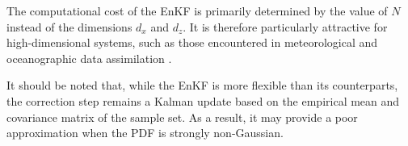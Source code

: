 The computational cost of the EnKF is primarily determined by the value of $N$ instead of the dimensions $d_x$ and $d_z$. It is therefore particularly attractive for high-dimensional systems, such as those encountered in meteorological and oceanographic data assimilation \cite{bib:EnKF-atmosphere}.

It should be noted that, while the EnKF is more flexible than its counterparts, the correction step remains a Kalman update based on the empirical mean and covariance matrix of the sample set. As a result, it may provide a poor approximation when the PDF is strongly non-Gaussian.
